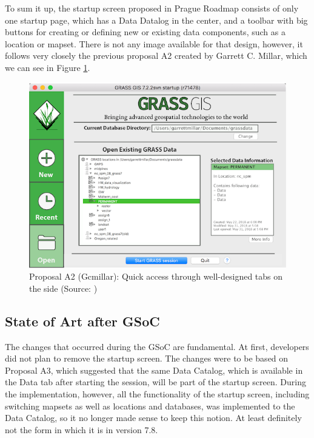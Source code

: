 \documentclass[a4paper,10pt,twoside]{article}
\begin{document}
To sum it up, the startup screen proposed in Prague Roadmap consists of only one 
startup page, which has a Data Datalog in the center, and a toolbar 
with big buttons for creating or defining new or existing data 
components, such as a location or mapset. There is not any image available
for that design, however, it follows very closely the previous proposal A2 
\cite{A2} created by  Garrett C. Millar, which we can see in Figure 
\ref{fig:roadmap_proposal}.

\vspace{0.3cm}
\begin{figure}[hbt!] 
\begin{center}
\includegraphics[width=12cm]{../pictures/roadmap_proposal.png} 
\caption[Proposal A2 (Gcmillar): Quick access through well-designed tabs on the side]{Proposal A2 (Gcmillar): Quick access through well-designed tabs on the side (Source: \cite{A2})}
\label{fig:roadmap_proposal}
\end{center}
\end{figure}

\newpage
\vspace*{-1cm}
\subsection{State of Art after GSoC}
\label{sec:afterGSoC}

\noindent The changes that occurred during the GSoC
are fundamental. At first, developers did not plan to remove the
startup screen. The changes were to be based on Proposal A3, which 
suggested that the same Data Catalog, which is available in the 
Data tab after starting the session, will be part of the startup screen. 
During the implementation, however, all the functionality of the startup screen,
including switching mapsets as well as locations and databases, was
implemented to the Data Catalog, so it no longer made sense to keep this
notion. At least definitely not the form in which it is in version
7.8.
\end{document}
